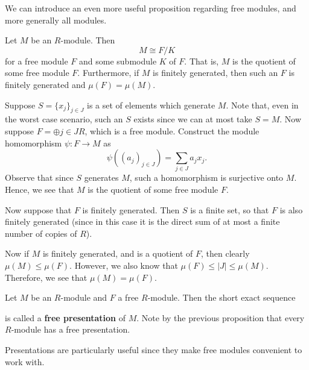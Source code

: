 We can introduce an even more useful proposition regarding free
modules, and more generally all modules. 

\begin{proposition}
    Let $M$ be an $R$-module. Then 
    \[
        M \cong F/K    
    \]
    for a free module $F$ and some submodule $K$ of $F$. That is,
    $M$ is the quotient of some free module $F$. Furthermore, if
    $M$ is finitely generated, then such an $F$ is finitely
    generated and $\mu(F) = \mu(M)$. 
\end{proposition}

\begin{prf}
    Suppose $S = \{x_j\}_{j \in J}$ is a set of elements which
    generate $M$. Note that, even in the worst case scenario, such
    an $S$ exists since we can at most take $S = M$. Now suppose
    $F = \oplus{j \in J}R$, which is a free module. Construct the
    module homomorphism $\psi: F \to M$ as 
    \[
        \psi((a_j)_{j \in J}) = \sum_{j \in J} a_jx_j.
    \]  
    Observe that since $S$ generates $M$, such a homomorphism is
    surjective onto $M$. Hence, we see that $M$ is the quotient of
    some free module $F$.

    Now suppose that $F$ is finitely generated. Then $S$ is a
    finite set, so that $F$ is also finitely generated (since in
    this case it is the direct sum of at most a finite number of
    copies of $R$). 

    Now if $M$ is finitely generated, and is a quotient of $F$,
    then clearly $\mu(M) \le \mu(F)$. However, we also know that
    $\mu(F) \le |J| \le \mu(M)$. Therefore, we see that $\mu(M) =
    \mu(F)$. 
\end{prf}

\begin{definition}
    Let $M$ be an $R$-module and $F$ a free $R$-module. Then the
    short exact sequence 
    \begin{center}
    \end{center}
    is called a \textbf{free presentation} of $M$. Note by the
    previous proposition that every $R$-module has a free
    presentation. 
\end{definition}

Presentations are particularly useful since they make free modules
convenient to work with. 

